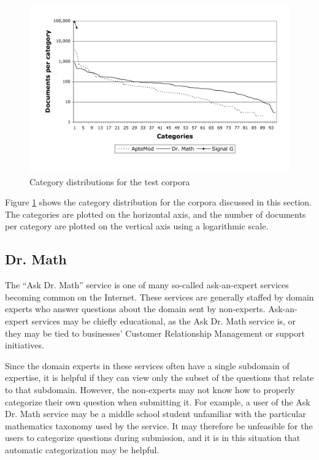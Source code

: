 \begin{figure}
\begin{center}
\includegraphics[width=\linewidth]{figures/Corpora-catdist.pdf}
\caption{Category distributions for the test corpora}
\label{Corpora-catdist}
\end{center}
\end{figure}

Figure \ref{Corpora-catdist} shows the category distribution for
the corpora discussed in this section.  The categories are plotted on
the horizontal axis, and the number of documents per category are
plotted on the vertical axis using a logarithmic scale.


\subsection{Dr. Math}

The ``Ask Dr. Math'' service \cite{drmath} is one of many so-called
ask-an-expert services becoming common on the Internet.  These
services are generally staffed by domain experts who answer questions
about the domain sent by non-experts.  Ask-an-expert services may be
chiefly educational, as the Ask Dr. Math service is, or they may be
tied to businesses' Customer Relationship Management or support
initiatives.

Since the domain experts in these services often have a single
subdomain of expertise, it is helpful if they can view only the subset
of the questions that relate to that subdomain.  However, the
non-experts may not know how to properly categorize their own question
when submitting it.  For example, a user of the Ask Dr. Math service
may be a middle school student unfamiliar with the particular
mathematics taxonomy used by the service.  It may therefore be
unfeasible for the users to categorize questions during submission,
and it is in this situation that automatic categorization may be
helpful.

